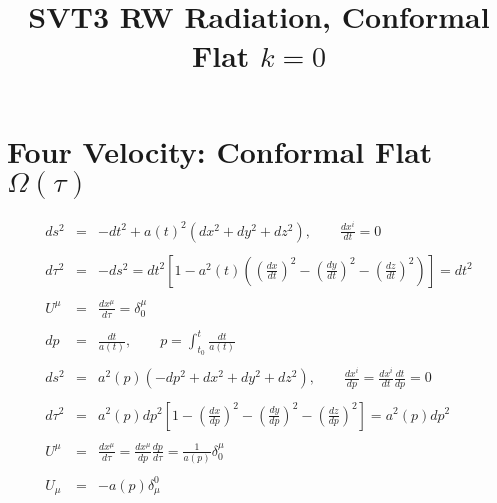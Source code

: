 \documentclass[10pt,letterpaper]{article}
\title{SVT3 RW Radiation, Conformal Flat $k=0$}
\date{}
\numberwithin{equation}{section}
\begin{document}
 
\maketitle
\noindent 
%
%
\section{Four Velocity: Conformal Flat $\Omega(\tau)$}
\begin{eqnarray}
ds^2 &=& -dt^2 + a(t)^2( dx^2 + dy^2+dz^2),\qquad \frac{dx^i}{dt} = 0
\\ \nonumber\\
d\tau^2 &=& -ds^2 = dt^2\left[ 1- a^2(t)\left(\left(\frac{dx}{dt}\right)^2 - \left(\frac{dy}{dt}\right)^2-\left(\frac{dz}{dt}\right)^2\right)\right] = dt^2
\\ \nonumber\\
U^\mu &=& \frac{dx^\mu}{d\tau} = \delta^\mu_0
\\ \nonumber\\
dp &=& \frac{dt}{a(t)},\qquad p = \int_{t_0}^t \frac{dt}{a(t)}
\\ \nonumber\\
ds^2 &=& a^2(p)\left( -dp^2 + dx^2+dy^2+dz^2\right),\qquad \frac{dx^i}{dp} = \frac{dx^i}{dt}\frac{dt}{dp} = 0
\\ \nonumber\\
d\tau^2 &=& a^2(p) dp^2\left[ 1- \left(\frac{dx}{dp}\right)^2 - \left(\frac{dy}{dp}\right)^2-\left(\frac{dz}{dp}\right)^2\right] = a^2(p)dp^2
\\ \nonumber\\
U^\mu &=& \frac{dx^\mu}{d\tau} = \frac{dx^\mu}{dp}\frac{dp}{d\tau} = \frac{1}{a(p)}\delta^\mu_0
\\ \nonumber\\
U_\mu &=& -a(p)\delta_\mu^0
\end{eqnarray}
%
%
\end{document}
